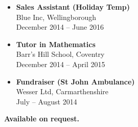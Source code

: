 \begin{itemize}
	\item \textbf{Sales Assistant (Holiday Temp)} \\
	Blue Inc, Wellingborough \\
	December 2014 -- June 2016
	\item \textbf{Tutor in Mathematics} \\
	Barr's Hill School, Coventry \\
	December 2014 -- April 2015
	\item \textbf{Fundraiser (St John Ambulance)} \\
	Wesser Ltd, Carmarthenshire \\
	July -- August 2014
\end{itemize}

\medskip


\normalsize \textbf{Available on request.}